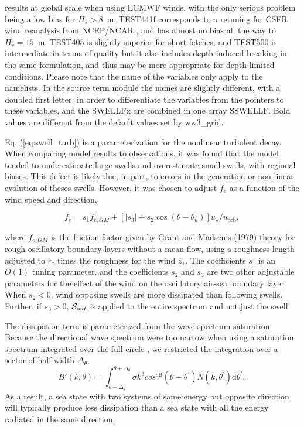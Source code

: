 \begin{landscape}
\begin{table}
{results at global scale when using ECMWF winds, with the only serious problem being a low bias for $H_s > 8$~m. 
TEST441f corresponds to a retuning for CSFR wind reanalysis from NCEP/NCAR \citep{art:CFSR10}, and 
has almost no bias all the way to $H_s = 15$~m.
TEST405 
is slightly superior for short fetches, and TEST500 is intermediate in terms of quality 
but it also includes depth-induced breaking in the same formulation, 
and thus may be more appropriate for depth-limited conditions.
 Please
note that the name of the variables only apply to the namelists. In the source
term module the names are slightly different, with a doubled first letter, in
order to differentiate the variables from the pointers to these variables, and
the SWELLFx are combined in one array SSWELLF. Bold values are different from the 
default values set by ww3\_grid.} \label{tab:ST4_parSIN}
\end{table}
\end{landscape}



Eq. (\ref{eq:swell_turb}) is a parameterization for the
nonlinear turbulent decay. When comparing model results to observations, it
was found that the model tended to underestimate large swells and overestimate
small swells, with regional biases. This defect is likely due, in part, to
errors in the generation or non-linear evolution of theses swells. However, it
was chosen to adjust $f_e$ as a function of the wind speed and direction,

\begin{equation}
f_e = s_1 f_{e,GM} + \left[\left|s_3\right| + s_2 \cos
(\theta-\theta_u)\right]u_\star / u_{\mathrm{orb}},\label{fevar}
\end{equation}

\noindent
where $f_{e,GM}$ is the friction factor given by Grant and Madsen's
(1979)\nocite{art:GM79} theory for rough oscillatory boundary layers without a
mean flow, using a roughness length adjusted to $r_z$ times the roughness for
the wind $z_1$. The coefficients $s_1$ is an $O(1)$ tuning parameter, and the
coefficients $s_2$ and $s_3$ are two other adjustable parameters for the
effect of the wind on the oscillatory air-sea boundary layer. When $s_2 < 0$,
wind opposing swells are more dissipated than following swells. Further, if
$s_3 > 0$, ${\cal S}_{out}$ is applied to the entire spectrum and not just the
swell.

\noindent
The dissipation term is parameterized from the wave spectrum saturation. Because the directional wave spectrum 
were too narrow when using a 
saturation spectrum integrated over the full circle \citep{art:AL06},
we restricted the integration over a sector of half-width $\Delta_\theta$, 
\begin{equation}
B'\left(k,\theta\right)=
\int_{\theta-\Delta_\theta}^{\theta+\Delta_\theta} \sigma k^3 cos^{\mathrm{sB}}\left(\theta-
\theta^{\prime}\right) N(k,\theta^{\prime}) \mathrm d
\theta^{\prime} \label{defBofkprime},
\end{equation}
As a result, a sea state with two systems of same energy but opposite direction will typically produce less dissipation than a sea state 
with all the energy radiated in the same direction. 

